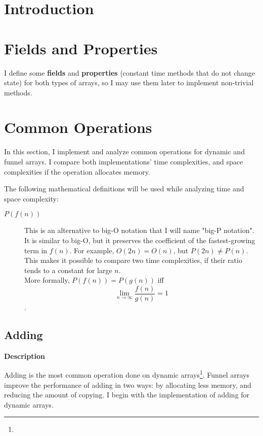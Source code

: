 \documentclass{article}
\newcommand{\descriptn}{\textbf{Description}}
\newcommand{\bigo}{O}
\newcommand{\biggo}{P}
\begin{document}
	\begin{abstract}
	\end{abstract}

	\section{Introduction}
	
	\section{Fields and Properties}
	
	I define some \textbf{fields} and \textbf{properties} (constant time methods that do not change state) for both types of arrays, so I may use them later to implement non-trivial methods.
	
	\section{Common Operations}
	
	In this section, I implement and analyze common operations for dynamic and funnel arrays. I compare both implementations' time complexities, and space complexities if the operation allocates memory.
	
	The following mathematical definitions will be used while analyzing time and space complexity:
	
	\begin{description}
		\item[$\biggo(f(n))$] This is an alternative to big-O notation that I will name "big-P notation". It is similar to big-O, but it preserves the coefficient of the fastest-growing term in $f(n)$. For example, $\bigo(2n) = \bigo(n)$, but $\biggo(2n) \neq \biggo(n)$. This makes it possible to compare two time complexities, if their ratio tends to a constant for large $n$.\\
		More formally, $\biggo(f(n)) = \biggo(g(n))$ iff $$\lim_{n \to \infty} {\frac{f(n)}{g(n)}} = 1$$.
	\end{description}
	
	\subsection{Adding}
	
	\descriptn
	
	Adding is the most common operation done on dynamic arrays\footnote{}. Funnel arrays improve the performance of adding in two ways: by allocating less memory, and reducing the amount of copying. I begin with the implementation of adding for dynamic arrays.
	
\end{document}
